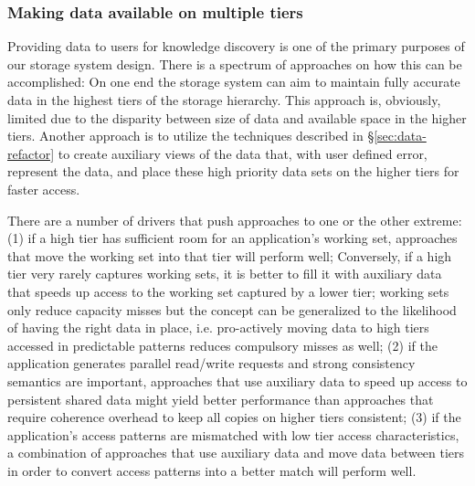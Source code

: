 
\subsubsection*{Making data available on multiple tiers}
\label{sec:manag-data-mult}
 Providing data to users for knowledge discovery is
one of the primary purposes of our storage system design. There is a
spectrum of approaches on how
this can be accomplished: On one end the storage system can aim to maintain
fully accurate data in the highest tiers of the storage hierarchy. This
approach is, obviously, limited due to the disparity between size of data
and available space in the higher tiers. Another approach is to utilize the
techniques described in \S\ref{sec:data-refactor} to create auxiliary views of
the data that, with user defined error, represent the data, and place these
high priority  data sets on the higher tiers for faster access. 

There are a
number of drivers that push approaches to one or the other extreme:
(1) if a high tier has sufficient room for an application's working
set, approaches that move the working set into that tier will perform
well; Conversely, if a high tier very rarely captures working sets,
it is better to fill it with auxiliary data that speeds up access
to the working set captured by a lower tier; working sets only
reduce capacity misses but the concept can be generalized to the
likelihood of having the right data in place, i.e. pro-actively
moving data to high tiers accessed in predictable patterns reduces
compulsory misses as well; (2) if the application generates parallel
read/write requests and strong consistency semantics are important,
approaches that use auxiliary data to speed up access to persistent
shared data might yield better performance than approaches that
require coherence overhead to keep all copies on higher tiers
consistent; (3) if the application's access patterns are mismatched
with low tier access characteristics, a combination of approaches
that use auxiliary data and move data between tiers in order to
convert access patterns into a better match will perform well.

